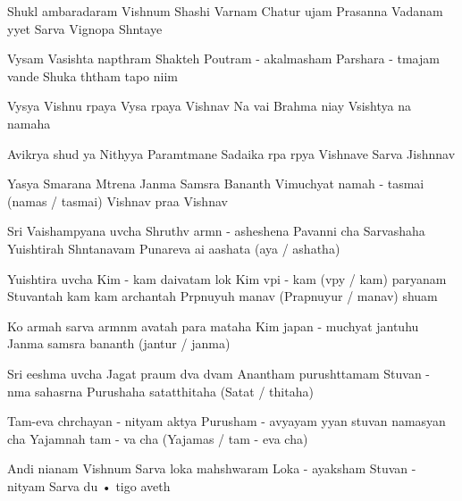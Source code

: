 \documentclass[20pt]{article}
\begin{document}

\SlokaHuge
{Shukl{\A} ambaradaram Vishnum} {Shashi Varnam Chatur {\Bh}ujam}
{Prasanna Vadanam {\Dh}y{\A}yet} {Sarva Vignopa Sh{\A}ntaye}

\phantom{\countr}
\SlokaHuge
{Vy{\A}sam Vasishta napth{\A}ram} {Shakteh Poutram - akalmasham}
{Par{\A}shara - {\A}tmajam vande} {Shuka th{\A}tham tapo ni{\dhh}im}

\SlokaHuge
{Vy{\A}s{\A}ya Vishnu r{\oo}paya} {Vy{\A}sa r{\oo}paya Vishnav{\e}}
{Na{\mo} vai Brahma ni{\dhh}ay{\e}} {V{\aaa}sisht{\A}ya na{\mo} namaha}

\newpage

\SlokaHuge
{Avik{\A}r{\A}ya shud{\dhh} {\A}ya} {Nithy{\A}ya Param{\A}tmane}
{Sadaika r{\oo}pa r{\oo}p{\A}ya} {Vishnave Sarva Jishnnav{\e}}

\SlokaHuge
{Yasya Smarana M{\A}trena} {Janma Sams{\A}ra Ban{\dhh}an{\A}th}
{Vimuchyat{\e} namah - tasmai (namas / tasmai)} {Vishnav{\e} pra{\bh}a Vishnav{\e}}


\SlokaHeaderHuge
{Sri Vaishamp{\A}yana uv{\A}cha}
{Shruthv{\A} {\Dh}arm{\A}n - asheshena} {Pavan{\A}ni cha Sarvashaha}
{Yu{\dhh}ishtirah Sh{\A}ntanavam} {Punareva \dsh a{\bh}i \dsh a{\bh}ashata (a{\bh}ya / {\bh}ashatha)}

\newpage

\SlokaHeaderHuge
 {Yu{\dhh}ishtira uv{\A}cha}
{Kim - {\e}kam daivatam lok{\e}} {Kim v{\A}pi - {\e}kam (v{\A}py{\e} / kam) par{\A}yanam}
{Stuvantah kam kam \dsh archantah} {Pr{\A}pnuyuh \dsh manav{\ah} (Prapnuyur / manav{\ah}) shu{\bh}am}

\SlokaHuge
{Ko {\Dh}armah sarva {\Dh}arm{\A}n{\aaa}m} {{\bh}avatah para{\mo} mataha}
{Kim japan - muchyat{\e} jantuhu} {Janma sams{\A}ra ban{\dhh}an{\A}th (jantur / janma)}

\SlokaHeaderHuge
{Sri {\Bh}eeshma uv{\A}cha}
{Jagat pra{\bh}um d{\e}va d{\e}vam} {Anantham purush{\oh}ttamam}
{Stuvan - n{\A}ma sahasr{\e}na} {Purushaha satat{\oh}thitaha (Satat{\oh} / thitaha)}

\newpage

\SlokaHuge
{Tam-eva ch{\aaa}rchayan - nityam} {{\Bh}aktya Purusham - avyayam}
{{\Dh}y{\A}yan stuvan namasyan \dsh cha} {Yajam{\aaa}nah tam - {\e}va cha (Yajam{\an}as / tam - eva cha)}

\SlokaHuge
{An{\aaa}di ni{\dhh}anam Vishnum} {Sarva loka mah{\e}shwaram}
{Loka - a{\dhh}yaksham Stuvan - nityam} {Sarva du {•} {\A}tigo {\bh}aveth}
\end{document}
